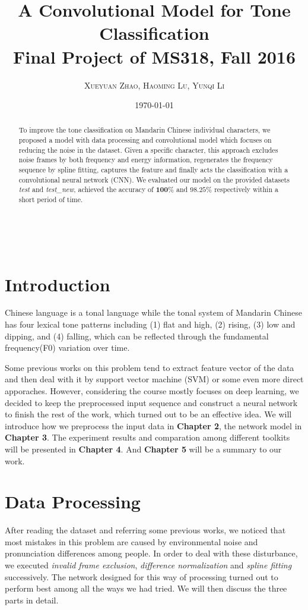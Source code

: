 \documentclass[a4paper, 11pt]{article} %
\title{\textbf{A Convolutional Model for Tone Classification}\\ \vspace{0.5cm}
{Final Project of MS318, Fall 2016}}
\author{\textsc{Xueyuan Zhao, Haoming Lu, Yunqi Li} 
\\{\textit{}}}
\date{\today}
\makeatletter
\renewcommand{\maketitle}{ %
\begin{flushright} %
{\LARGE\@title} %

\vspace{50pt} %

{\large\@author} %
\\\@date %

\vspace{40pt} %
\end{flushright}
}
\makeatother
\begin{document}
\maketitle

\begin{abstract}
To improve the tone classification on Mandarin Chinese individual characters, we proposed a model with data processing and convolutional model which focuses on reducing the noise in the dataset. Given a specific character, this approach excludes noise frames by both frequency and energy information, regenerates the frequency sequence by spline fitting, captures the feature and finally acts the classification with a convolutional neural network (CNN).  We evaluated our model on the provided datasets \textit{test} and \textit{test\_new}, achieved the accuracy of $\mathbf{100\%}$ and $\mathbf{98.25\%}$ respectively within a short period of time.
\end{abstract}

\vspace{30pt} 

\section{Introduction}
\indent
Chinese language is a tonal language while the tonal system of Mandarin Chinese has four lexical tone patterns including (1) flat and high, (2) rising, (3) low and dipping, and (4) falling, which can be reflected through the fundamental frequency(F0) variation over time. 
\par
Some previous works on this problem tend to extract feature vector of the data and then deal with it by support vector machine (SVM)\cite{wang2009tone} or some even more direct apporaches. However, considering the course mostly focuses on deep learning, we decided to keep the preprocessed input sequence and construct a neural network to finish the rest of the work, which turned out to be an effective idea. We will introduce how we preprocess the input data in \textbf{Chapter 2}, the network model in \textbf{Chapter 3}. The experiment results and comparation among different toolkits will be presented in \textbf{Chapter 4}. And \textbf{Chapter 5} will be a summary to our work.

\section{Data Processing}
After reading the dataset and referring some previous works, we noticed that most mistakes in this problem are caused by environmental noise and pronunciation differences among people. In order to deal with these disturbance, we executed \textit{invalid frame exclusion}, \textit{difference normalization} and \textit{spline fitting} successively. The network designed for this way of processing turned out to perform best among all the ways we had tried. We will then discuss the three parts in detail.
\\
\end{document}
